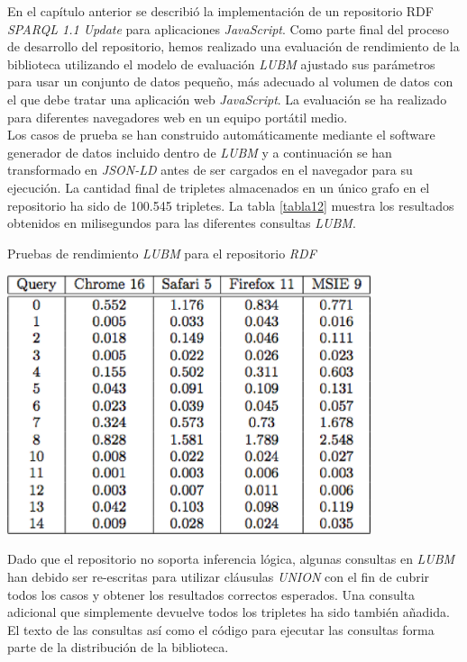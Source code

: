 En el cap\'itulo anterior \cite{sec:rdfstorejs} se describi\'o la implementaci\'on de un repositorio RDF \textit{SPARQL 1.1 Update} para aplicaciones \textit{JavaScript}.
Como parte final del proceso de desarrollo del repositorio, hemos realizado una evaluaci\'on de rendimiento de la biblioteca utilizando el modelo de evaluaci\'on \textit{LUBM} \cite{lubm} ajustado sus par\'ametros para usar un conjunto de datos peque\~no, m\'as adecuado al volumen de datos con el que debe tratar una aplicaci\'on web \textit{JavaScript}. La evaluaci\'on se ha realizado para diferentes navegadores web en un equipo port\'atil medio.\\
Los casos de prueba se han construido autom\'aticamente mediante el software generador de datos incluido dentro de \textit{LUBM} y a continuaci\'on se han transformado en \textit{JSON-LD} antes de ser cargados en el navegador para su ejecuci\'on. La cantidad final de tripletes almacenados en un \'unico grafo en el repositorio ha sido de 100.545 tripletes. La tabla \ref{tabla12} muestra los resultados obtenidos en milisegundos para las diferentes consultas \textit{LUBM}.\\

\begin{table}
\vspace{2.4in}
\caption{Pruebas de rendimiento \textit{LUBM} para el repositorio \textit{RDF}}
\includegraphics[width=0.8\textwidth]{tabla12}
\label{tabla12}
\end{table}

 Dado que el repositorio no soporta inferencia l\'ogica, algunas consultas en \textit{LUBM} han debido ser re-escritas para utilizar cl\'ausulas \textit{UNION} con el fin de cubrir todos los casos y obtener los resultados correctos esperados. Una consulta adicional que simplemente devuelve todos los tripletes ha sido tambi\'en a\~nadida. El texto de las consultas as\'i como el c\'odigo para ejecutar las consultas forma parte de la distribuci\'on de la biblioteca.


